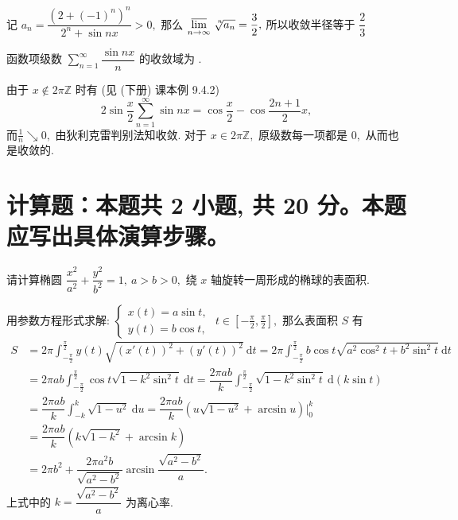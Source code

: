\begin{solution}
记 $\displaystyle a_n = \dfrac{\left( 2 + (-1)^n \right)^n}{2^n + \sin nx} > 0,$ 那么 $\displaystyle \varlimsup_{n\to\infty} \nroot[n]{a_n} = \dfrac{3}{2},$ 所以收敛半径等于 $\dfrac{2}{3}$
\end{solution}

\begin{question}
函数项级数 $\displaystyle \sum_{n=1}^{\infty} \dfrac{\sin nx}{n}$ 的收敛域为 \fillin[$\mathbb{R}$].
\end{question}

\begin{solution}
由于 $x \not\in 2\pi\mathbb{Z}$ 时有 (见 (下册) 课本例 9.4.2)
\begin{equation*}
2\sin\dfrac{x}{2} \sum_{n=1}^{\infty} \sin nx = \cos\dfrac{x}{2} - \cos\dfrac{2n+1}{2}x,
\end{equation*}
而$\frac{1}{n} \searrow 0,$ 由狄利克雷判别法知收敛. 对于 $x \in 2\pi\mathbb{Z},$ 原级数每一项都是 $0,$ 从而也是收敛的.
\end{solution}


\section{计算题：本题共 2 小题, 共 20 分。本题应写出具体演算步骤。}


\begin{question}[points = 10]
请计算椭圆 $\displaystyle \dfrac{x^2}{a^2} + \dfrac{y^2}{b^2} = 1, ~ a > b > 0,$ 绕 $x$ 轴旋转一周形成的椭球的表面积.

\end{question}

\begin{solution}
用参数方程形式求解: $\begin{cases} x(t) = a \sin t, \\ y(t) = b \cos t,\end{cases}$ $t \in \left[ -\frac{\pi}{2}, \frac{\pi}{2} \right],$ 那么表面积 $S$ 有
\begin{align*}
S & = 2\pi \int_{-\frac{\pi}{2}}^{\frac{\pi}{2}} y(t) \sqrt{(x'(t))^2 + (y'(t))^2} ~ \mathrm{d} t = 2\pi \int_{-\frac{\pi}{2}}^{\frac{\pi}{2}} b \cos t \sqrt{a^2 \cos^2 t + b^2 \sin^2 t} ~ \mathrm{d} t \\
& = 2 \pi ab \int_{-\frac{\pi}{2}}^{\frac{\pi}{2}} \cos t \sqrt{1 - k^2\sin^2 t} ~ \mathrm{d} t = \dfrac{2 \pi ab}{k} \int_{-\frac{\pi}{2}}^{\frac{\pi}{2}} \sqrt{1 - k^2\sin^2 t} ~ \mathrm{d} (k \sin t) \\
& = \dfrac{2 \pi ab}{k} \int_{-k}^{k} \sqrt{1 - u^2} ~ \mathrm{d} u = \dfrac{2 \pi ab}{k} \left( u\sqrt{1-u^2} + \arcsin u \right) \bigg|_0^k \\
& = \dfrac{2 \pi ab}{k} \left( k\sqrt{1-k^2} + \arcsin k \right) \\
& = 2\pi b^2 + \dfrac{2\pi a^2b}{\sqrt{a^2 - b^2}} \arcsin\dfrac{\sqrt{a^2 - b^2}}{a}.
\end{align*}
上式中的 $k = \dfrac{\sqrt{a^2 - b^2}}{a}$ 为离心率.
\end{solution}

